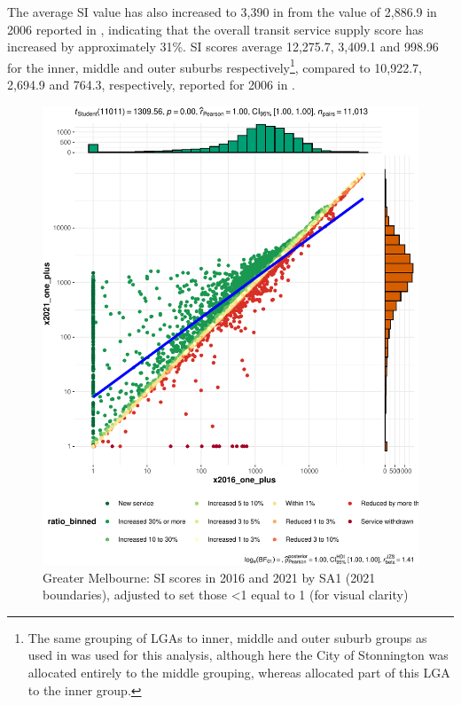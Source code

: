 \documentclass[preprint, 3p,
authoryear]{elsarticle} %
\begin{document}
The average SI value has also increased to 3,390 in from the value of
2,886.9 in 2006 reported in \citet{currie2010identifying}, indicating
that the overall transit service supply score has increased by
approximately 31\%. SI scores average 12,275.7, 3,409.1 and 998.96 for
the inner, middle and outer suburbs respectively\footnote{The same
  grouping of LGAs to inner, middle and outer suburb groups as used in
  \citet{currie2010identifying} was used for this analysis, although
  here the City of Stonnington was allocated entirely to the middle
  grouping, whereas \citet{currie2010identifying} allocated part of this
  LGA to the inner group.}, compared to 10,922.7, 2,694.9 and 764.3,
respectively, reported for 2006 in \citet{currie2010identifying}.

\begin{figure}
\centering
\includegraphics{Leveraging_GTFS_to_assess_transit_supply_Transport_Geography_files/figure-latex/Greater_Melbourne_2016_2021_scatterplot_SA12021-1.pdf}
\caption{Greater Melbourne: SI scores in 2016 and 2021 by SA1 (2021
boundaries), adjusted to set those \textless1 equal to 1 (for visual
clarity)}
\end{figure}
\end{document}
